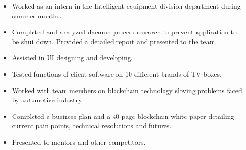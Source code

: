 \documentclass[10pt,letterpaper,ragged2e]{altacv}
\begin{document}

\begin{fullwidth}
\makecvheader
\end{fullwidth}



\begin{itemize}
  \item Worked as an intern in the Intelligent equipment division department during summer months.
  \item Completed and analyzed daemon process research to prevent application to be shut down. Provided a detailed report and presented to the team.
  \item Assisted in UI designing and developing.
  \item Tested functions of client software on 10 different brands of TV boxes.
\end{itemize}
\smallskip
{}
\begin{itemize}
  \item Worked with team members on blockchain technology sloving problems faced by automotive industry.
  \item Completed a business plan and a 40-page blockchain white paper detailing current pain points, technical resolutions and futures.
  \item Presented to mentors and other competitors.
\end{itemize}
\end{document}
